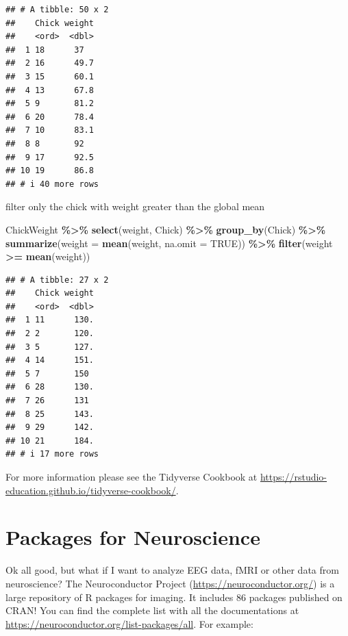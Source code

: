 \documentclass[
]{article}
\newenvironment{Shaded}{\begin{snugshade}}{\end{snugshade}}
\newcommand{\AttributeTok}[1]{\textcolor[rgb]{0.13,0.29,0.53}{#1}}
\newcommand{\ConstantTok}[1]{\textcolor[rgb]{0.56,0.35,0.01}{#1}}
\newcommand{\FunctionTok}[1]{\textcolor[rgb]{0.13,0.29,0.53}{\textbf{#1}}}
\newcommand{\NormalTok}[1]{#1}
\newcommand{\SpecialCharTok}[1]{\textcolor[rgb]{0.81,0.36,0.00}{\textbf{#1}}}
\begin{document}
\begin{verbatim}
## # A tibble: 50 x 2
##    Chick weight
##    <ord>  <dbl>
##  1 18      37  
##  2 16      49.7
##  3 15      60.1
##  4 13      67.8
##  5 9       81.2
##  6 20      78.4
##  7 10      83.1
##  8 8       92  
##  9 17      92.5
## 10 19      86.8
## # i 40 more rows
\end{verbatim}

filter only the chick with weight greater than the global mean

\begin{Shaded}
\begin{Highlighting}[]
\NormalTok{ChickWeight }\SpecialCharTok{\%\textgreater{}\%} \FunctionTok{select}\NormalTok{(weight, Chick) }\SpecialCharTok{\%\textgreater{}\%}
  \FunctionTok{group\_by}\NormalTok{(Chick) }\SpecialCharTok{\%\textgreater{}\%}
  \FunctionTok{summarize}\NormalTok{(}\AttributeTok{weight =} \FunctionTok{mean}\NormalTok{(weight, }\AttributeTok{na.omit =} \ConstantTok{TRUE}\NormalTok{)) }\SpecialCharTok{\%\textgreater{}\%}
  \FunctionTok{filter}\NormalTok{(weight }\SpecialCharTok{\textgreater{}=} \FunctionTok{mean}\NormalTok{(weight))}
\end{Highlighting}
\end{Shaded}

\begin{verbatim}
## # A tibble: 27 x 2
##    Chick weight
##    <ord>  <dbl>
##  1 11      130.
##  2 2       120.
##  3 5       127.
##  4 14      151.
##  5 7       150 
##  6 28      130.
##  7 26      131 
##  8 25      143.
##  9 29      142.
## 10 21      184.
## # i 17 more rows
\end{verbatim}

For more information please see the Tidyverse Cookbook at
\url{https://rstudio-education.github.io/tidyverse-cookbook/}.

\hypertarget{packages-for-neuroscience}{%
\section{Packages for Neuroscience}\label{packages-for-neuroscience}}

Ok all good, but what if I want to analyze EEG data, fMRI or other data
from neuroscience? The Neuroconductor Project
(\url{https://neuroconductor.org/}) is a large repository of R packages
for imaging. It includes 86 packages published on CRAN! You can find the
complete list with all the documentations at
\url{https://neuroconductor.org/list-packages/all}. For example:
\end{document}

